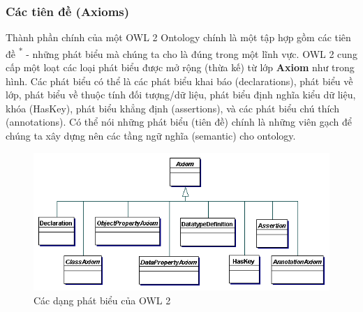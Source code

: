 \subsubsection{Các tiên đề (Axioms)}
{\let\thefootnote\relax{}
	}
	Thành phần chính của một OWL 2 Ontology chính là một tập hợp gồm các tiên đề \textsuperscript{*} - những phát biểu mà chúng ta cho là đúng trong một lĩnh vực. OWL 2 cung cấp một loạt các loại phát biểu được mở rộng (thừa kế) từ lớp \textbf{Axiom} như trong hình. Các phát biểu có thể là các phát biểu khai báo (declarations), phát biểu về lớp, phát biểu về thuộc tính đối tượng/dữ liệu, phát biểu định nghĩa kiểu dữ liệu, khóa (HasKey), phát biểu khẳng định (assertions), và các phát biểu chú thích (annotations). Có thể nói những phát biểu (tiên đề) chính là những viên gạch để chúng ta xây dựng nên các tầng ngữ nghĩa (semantic) cho ontology.
	\begin{figure}[!h]
		\centering
		\includegraphics[width=150mm]{Figures/axioms.png}
		\caption{Các dạng phát biểu của OWL 2\label{overflow}}
	\end{figure}
	
